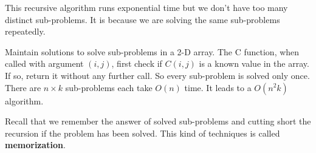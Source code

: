 This recursive algorithm runs exponential time but we don't have too many distinct sub-problems. It is because we are solving the same sub-problems repeatedly.

Maintain solutions to solve sub-problems in a 2-D array. The C function, when called with argument $(i, j)$, first check if $C(i, j)$ is a known value in the array. If so, return it without any further call. So every sub-problem is solved only once. There are $n \times k$ sub-problems each take $O(n)$ time. It leads to a $O(n^2 k)$ algorithm.

Recall that we remember the answer of solved sub-problems and cutting short the recursion if the problem has been solved. This kind of techniques is called \textbf{memorization}.

